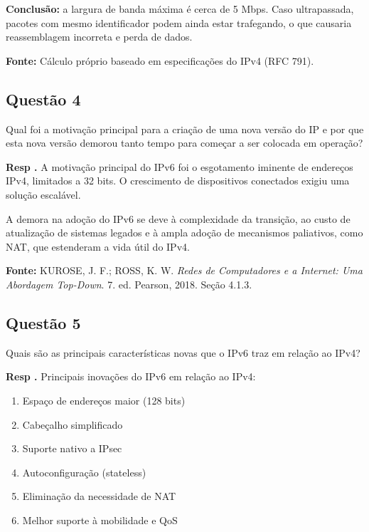 \textbf{Conclusão:} a largura de banda máxima é cerca de 5 Mbps. Caso ultrapassada, pacotes com mesmo identificador podem ainda estar trafegando, o que causaria reassemblagem incorreta e perda de dados.

\textbf{Fonte:} Cálculo próprio baseado em especificações do IPv4 (RFC 791).
\newline

\subsection{Questão 4}
Qual foi a motivação principal para a criação de uma nova versão do
IP e por que esta nova versão demorou tanto tempo para começar a ser colocada em
operação?
\newline

\textbf{Resp .}
A motivação principal do IPv6 foi o esgotamento iminente de endereços IPv4, limitados a 32 bits. O crescimento de dispositivos conectados exigiu uma solução escalável.
\newline

A demora na adoção do IPv6 se deve à complexidade da transição, ao custo de atualização de sistemas legados e à ampla adoção de mecanismos paliativos, como NAT, que estenderam a vida útil do IPv4.
\newline

\textbf{Fonte:} KUROSE, J. F.; ROSS, K. W. \textit{Redes de Computadores e a Internet: Uma Abordagem Top-Down}. 7. ed. Pearson, 2018. Seção 4.1.3.
\newline

\subsection{Questão 5}
Quais são as principais características novas que o IPv6 traz em
relação ao IPv4?
\newline


\textbf{Resp .}
Principais inovações do IPv6 em relação ao IPv4:

\begin{enumerate}
    \item Espaço de endereços maior (128 bits)
    \item Cabeçalho simplificado
    \item Suporte nativo a IPsec
    \item Autoconfiguração (stateless)
    \item Eliminação da necessidade de NAT
    \item Melhor suporte à mobilidade e QoS
\end{enumerate}

